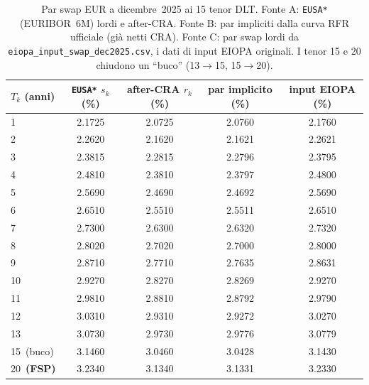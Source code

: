 \begin{table}[H]\centering\small
\caption{Par swap EUR a dicembre~2025 ai 15 tenor DLT. Fonte A: \texttt{EUSA*} (EURIBOR~6M) lordi e after-CRA. Fonte B: par impliciti dalla curva RFR ufficiale (gi\`a netti CRA). Fonte C: par swap lordi da \texttt{eiopa\_input\_swap\_dec2025.csv}, i dati di input EIOPA originali. I tenor 15 e 20 chiudono un ``buco'' (13$\to$15, 15$\to$20).}
\label{tab:input-dic}\renewcommand{\arraystretch}{1.15}
\begin{tabular}{lcccc}
\toprule
$T_k$ (anni) & \texttt{EUSA*} $s_k$ (\%) & after-CRA $r_k$ (\%) & par implicito (\%) & input EIOPA (\%)\\
\midrule
\rowcolor{rowtint}1 & 2.1725 & 2.0725 & 2.0760 & 2.1760\\
2 & 2.2620 & 2.1620 & 2.1621 & 2.2621\\
\rowcolor{rowtint}3 & 2.3815 & 2.2815 & 2.2796 & 2.3795\\
4 & 2.4810 & 2.3810 & 2.3797 & 2.4800\\
\rowcolor{rowtint}5 & 2.5690 & 2.4690 & 2.4692 & 2.5690\\
6 & 2.6510 & 2.5510 & 2.5511 & 2.6510\\
\rowcolor{rowtint}7 & 2.7300 & 2.6300 & 2.6320 & 2.7320\\
8 & 2.8020 & 2.7020 & 2.7000 & 2.8000\\
\rowcolor{rowtint}9 & 2.8710 & 2.7710 & 2.7635 & 2.8631\\
10 & 2.9270 & 2.8270 & 2.8269 & 2.9270\\
\rowcolor{rowtint}11 & 2.9810 & 2.8810 & 2.8792 & 2.9790\\
12 & 3.0310 & 2.9310 & 2.9272 & 3.0270\\
\rowcolor{rowtint}13 & 3.0730 & 2.9730 & 2.9776 & 3.0779\\
15~(buco) & 3.1460 & 3.0460 & 3.0428 & 3.1430\\
\rowcolor{rowtint}20~\textbf{(FSP)} & 3.2340 & 3.1340 & 3.1331 & 3.2330\\
\bottomrule
\end{tabular}
\end{table}
